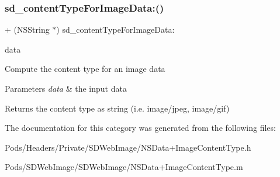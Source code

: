 \subsubsection{\texorpdfstring{sd\+\_\+content\+Type\+For\+Image\+Data\+:()}{sd\_contentTypeForImageData:()}\hspace{0.1cm}{\footnotesize\ttfamily [3/3]}}
{\footnotesize\ttfamily + (N\+S\+String $\ast$) sd\+\_\+content\+Type\+For\+Image\+Data\+: \begin{DoxyParamCaption}\item[{(N\+S\+Data $\ast$)}]{data }\end{DoxyParamCaption}}

Compute the content type for an image data


\begin{DoxyParams}{Parameters}
{\em data} & the input data\\
\hline
\end{DoxyParams}
\begin{DoxyReturn}{Returns}
the content type as string (i.\+e. image/jpeg, image/gif) 
\end{DoxyReturn}


The documentation for this category was generated from the following files\+:\begin{DoxyCompactItemize}
\item 
Pods/\+Headers/\+Private/\+S\+D\+Web\+Image/N\+S\+Data+\+Image\+Content\+Type.\+h\item 
Pods/\+S\+D\+Web\+Image/\+S\+D\+Web\+Image/N\+S\+Data+\+Image\+Content\+Type.\+m\end{DoxyCompactItemize}

